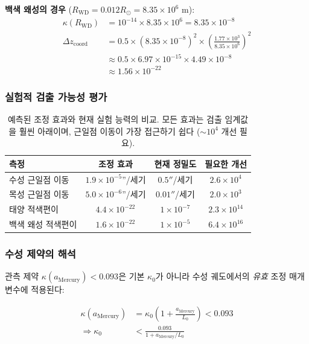 \documentclass[11pt,a4paper]{article}
\begin{document}
\textbf{백색 왜성의 경우} ($R_{\text{WD}} = 0.012 R_\odot = 8.35 \times 10^6$ m):
\begin{align}
\kappa(R_{\text{WD}}) &= 10^{-14} \times 8.35 \times 10^6 = 8.35 \times 10^{-8} \\
\Delta z_{\text{coord}} &= 0.5 \times (8.35 \times 10^{-8})^2 \times \left(\frac{1.77 \times 10^3}{8.35 \times 10^6}\right)^2 \\
&\approx 0.5 \times 6.97 \times 10^{-15} \times 4.49 \times 10^{-8} \\
&\approx 1.56 \times 10^{-22}
\end{align}

\subsubsection{실험적 검출 가능성 평가}

\begin{table}[htbp]
\centering
\begin{tabular}{lccc}
	\toprule
	\textbf{측정} & \textbf{조정 효과} & \textbf{현재 정밀도} & \textbf{필요한 개선} \\
	\midrule
	수성 근일점 이동 & $1.9 \times 10^{-5}$''/세기 & $0.5''$/세기 & $2.6 \times 10^4$ \\
	목성 근일점 이동 & $5.0 \times 10^{-6}$''/세기 & $0.01''$/세기 & $2.0 \times 10^3$ \\
	태양 적색편이 & $4.4 \times 10^{-22}$ & $1 \times 10^{-7}$ & $2.3 \times 10^{14}$ \\
	백색 왜성 적색편이 & $1.6 \times 10^{-22}$ & $1 \times 10^{-5}$ & $6.4 \times 10^{16}$ \\
	\bottomrule
\end{tabular}
\caption{예측된 조정 효과와 현재 실험 능력의 비교. 모든 효과는 검출 임계값을 훨씬 아래이며, 근일점 이동이 가장 접근하기 쉽다 ($\sim 10^4$ 개선 필요).}
\end{table}

\subsubsection{수성 제약의 해석}

관측 제약 $\kappa(a_{\text{Mercury}}) < 0.093$은 기본 $\kappa_0$가 아니라 수성 궤도에서의 \textit{유효} 조정 매개변수에 적용된다:

\begin{align}
\kappa(a_{\text{Mercury}}) &= \kappa_0 \left(1 + \frac{a_{\text{Mercury}}}{L_0}\right) < 0.093 \\
\Rightarrow \kappa_0 &< \frac{0.093}{1 + a_{\text{Mercury}}/L_0}
\end{align}
\end{document}
